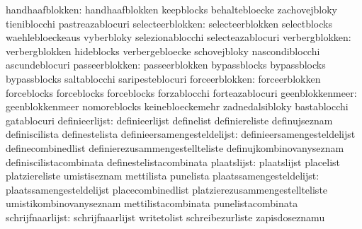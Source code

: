                 handhaafblokken:  handhaafblokken                  keepblocks
                                  behaltebloecke                   zachovejbloky
                                  tieniblocchi                     pastreazablocuri
               selecteerblokken:  selecteerblokken                 selectblocks
                                  waehlebloeckeaus                 vyberbloky
                                  selezionablocchi                 selecteazablocuri
                 verbergblokken:  verbergblokken                   hideblocks
                                  verbergebloecke                  schovejbloky
                                  nascondiblocchi                  ascundeblocuri
                 passeerblokken:  passeerblokken                   bypassblocks
                                  bypassblocks                     bypassblocks
                                  saltablocchi                     saripesteblocuri
                 forceerblokken:  forceerblokken                   forceblocks
                                  forceblocks                      forceblocks
                                  forzablocchi                     forteazablocuri
                geenblokkenmeer:  geenblokkenmeer                  nomoreblocks
                                  keinebloeckemehr                 zadnedalsibloky
                                  bastablocchi                     gatablocuri
                 definieerlijst:  definieerlijst                   definelist
                                  definiereliste                   definujseznam
                                  definiscilista                   definestelista
    definieersamengesteldelijst:  definieersamengesteldelijst      definecombinedlist
                                  definierezusammengestellteliste  definujkombinovanyseznam
                                  definiscilistacombinata          definestelistacombinata
                    plaatslijst:  plaatslijst                      placelist
                                  platziereliste                   umistiseznam
                                  mettilista                       punelista
       plaatssamengesteldelijst:  plaatssamengesteldelijst         placecombinedlist
                                  platzierezusammengestellteliste  umistikombinovanyseznam
                                  mettilistacombinata              punelistacombinata
               schrijfnaarlijst:  schrijfnaarlijst                 writetolist
                                  schreibezurliste                 zapisdoseznamu
